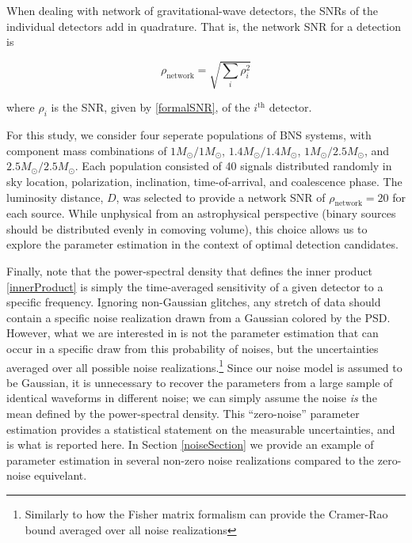 \documentclass[11pt,a4paper]{emulateapj}
\begin{document}
When dealing with network of gravitational-wave detectors, the SNRs of the individual detectors add in quadrature.  That is, the network SNR for a detection is

\begin{equation}
\rho_{\text{network}} = \sqrt{\sum_i \rho_{i}^2}
\label{SNRnetwork}
\end{equation}

\noindent where $\rho_i$ is the SNR, given by \eqref{formalSNR}, of the $i^{\text{th}}$ detector.

For this study, we consider four seperate populations of BNS systems, with component mass 
combinations of $1M_{\odot}/1M_{\odot}$, $1.4M_{\odot}/1.4M_{\odot}$, $1M_{\odot}/2.5M_{\odot}$, 
and $2.5M_{\odot}/2.5M_{\odot}$.  Each population consisted of 40 signals distributed randomly
in sky location, polarization, inclination, time-of-arrival, and coalescence phase.  The luminosity 
distance, $D$, was selected to provide a network SNR of $\rho_{\text{network}}=20$ for each source.
While unphysical from an astrophysical perspective (binary sources should be 
distributed evenly in comoving volume), this choice allows us to explore the parameter estimation
in the context of optimal detection candidates. 

Finally, note that the power-spectral density that defines the inner product \eqref{innerProduct} is simply 
the time-averaged sensitivity of a given detector to a specific frequency.  Ignoring non-Gaussian glitches,
 any stretch of data should contain a specific noise realization drawn from a Gaussian colored by the PSD.
   However, what we are interested in is not the parameter estimation that can occur in a specific draw
    from this probability of noises, but the uncertainties averaged over all possible noise
     realizations.\footnote{Similarly to how the Fisher matrix formalism can provide the Cramer-Rao bound averaged over
     all noise realizations} Since our noise model is assumed to be Gaussian, it is unnecessary to recover the
      parameters from a large sample of identical waveforms in different noise; we can simply assume the 
      noise \emph{is} the mean defined by the power-spectral density.  This ``zero-noise'' parameter estimation
       provides a statistical statement on the measurable uncertainties, and is what is reported here.  In Section
        \ref{noiseSection} we provide an example of parameter estimation in several non-zero noise realizations
compared to the zero-noise equivelant. 
\end{document}
